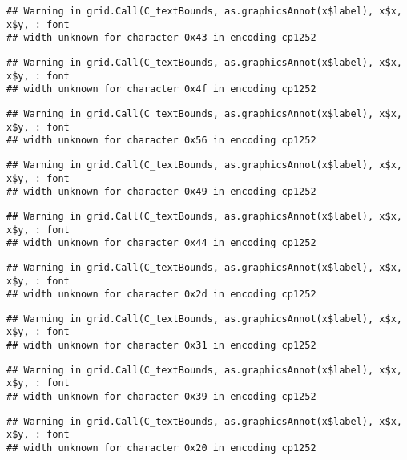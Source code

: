 \documentclass[
]{article}
\begin{document}
\begin{verbatim}
## Warning in grid.Call(C_textBounds, as.graphicsAnnot(x$label), x$x, x$y, : font
## width unknown for character 0x43 in encoding cp1252
\end{verbatim}

\begin{verbatim}
## Warning in grid.Call(C_textBounds, as.graphicsAnnot(x$label), x$x, x$y, : font
## width unknown for character 0x4f in encoding cp1252
\end{verbatim}

\begin{verbatim}
## Warning in grid.Call(C_textBounds, as.graphicsAnnot(x$label), x$x, x$y, : font
## width unknown for character 0x56 in encoding cp1252
\end{verbatim}

\begin{verbatim}
## Warning in grid.Call(C_textBounds, as.graphicsAnnot(x$label), x$x, x$y, : font
## width unknown for character 0x49 in encoding cp1252
\end{verbatim}

\begin{verbatim}
## Warning in grid.Call(C_textBounds, as.graphicsAnnot(x$label), x$x, x$y, : font
## width unknown for character 0x44 in encoding cp1252
\end{verbatim}

\begin{verbatim}
## Warning in grid.Call(C_textBounds, as.graphicsAnnot(x$label), x$x, x$y, : font
## width unknown for character 0x2d in encoding cp1252
\end{verbatim}

\begin{verbatim}
## Warning in grid.Call(C_textBounds, as.graphicsAnnot(x$label), x$x, x$y, : font
## width unknown for character 0x31 in encoding cp1252
\end{verbatim}

\begin{verbatim}
## Warning in grid.Call(C_textBounds, as.graphicsAnnot(x$label), x$x, x$y, : font
## width unknown for character 0x39 in encoding cp1252
\end{verbatim}

\begin{verbatim}
## Warning in grid.Call(C_textBounds, as.graphicsAnnot(x$label), x$x, x$y, : font
## width unknown for character 0x20 in encoding cp1252
\end{verbatim}
\end{document}

